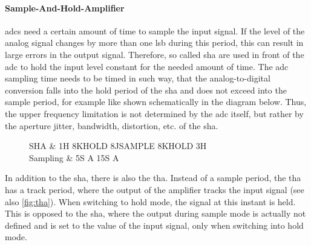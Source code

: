 

\paragraph{Sample-And-Hold-Amplifier}
\Glspl{adc} need a certain amount of time to sample the input signal.
If the level of the analog signal changes by more than one \gls{lsb} during this period, this can result in large errors in the output signal.
Therefore, so called \gls{sha} are used in front of the \gls{adc} to hold the input level constant for the needed amount of time.
The \gls{adc} sampling time needs to be timed in such way, that the analog-to-digital conversion falls into the hold period of the \gls{sha} and does not exceed into the sample period, for example like shown schematically in the diagram below. Thus, the upper frequency limitation is not determined by the \gls{adc} itself, but rather by the aperture jitter, bandwidth, distortion, etc. of the \gls{sha}. \cite{walt}



\begin{figure} [tbh]
	\centering
	\tikzexternaldisable
	\begin{tikztimingtable}
		[%
		timing/dslope=0.1,
		timing/name/.style={font=\sffamily\normalsize},
		timing/d/text/.style={font=\sffamily\normalsize},
		grayz/.style={timing/z/.append style={gray}},
		timing/n/.style={rectangle},
		timing/metachar={{K}[2]{#1l !{++(0,+.5\yunit)} N[rectangle,scale=.6]{\shortstack{#2}} !{++(0,-.5\yunit)} #1l}},
		timing/metachar={{J}[2]{#1h !{++(0,-.5\yunit)} N[rectangle,scale=.6]{\shortstack{#2}} !{++(0,+.5\yunit)} #1h}},
		]
		SHA & 1H 8K{HOLD} 8J{SAMPLE} 8K{HOLD} 3H\\
		Sampling & 5S A 15S A                    \\
	\end{tikztimingtable}
	\tikzexternalenable
\end{figure}

In addition to the \gls{sha}, there is also the \gls{tha}.
Instead of a sample period, the \gls{tha} has a track period, where the output of the amplifier tracks the input signal (see also \autoref{fig:tha}).
When switching to hold mode, the signal at this instant is held. This is opposed to the \gls{sha}, where the output during sample mode is actually not defined and is set to the value of the input signal, only when switching into hold mode.

